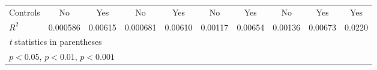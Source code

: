 {\begin{tabular}{l*{9}{c}}
Controls        &       No         &      Yes         &       No         &      Yes         &       No         &      Yes         &       No         &      Yes         &      Yes         \\
$ R^2 $         & 0.000586         &  0.00615         & 0.000681         &  0.00610         &  0.00117         &  0.00654         &  0.00136         &  0.00673         &   0.0220         \\
\hline\hline
\multicolumn{10}{l}{\footnotesize \textit{t} statistics in parentheses}\\
\multicolumn{10}{l}{\footnotesize \sym{*} \(p<0.05\), \sym{**} \(p<0.01\), \sym{***} \(p<0.001\)}\\
\end{tabular}
}

